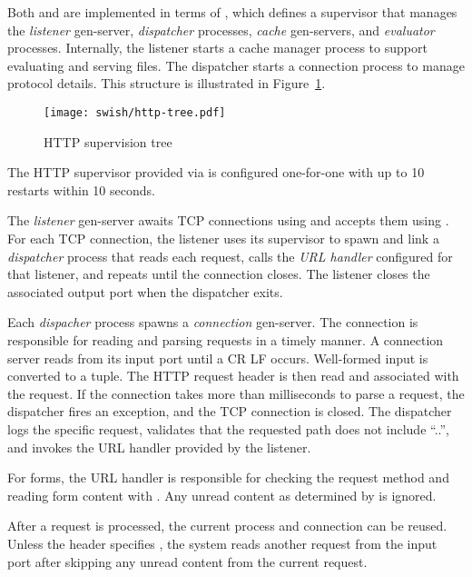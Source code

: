 Both  and  are
implemented in terms of , which defines a
supervisor that manages the \emph{listener} gen-server,
\emph{dispatcher} processes, \emph{cache} gen-servers, and
\emph{evaluator} processes. Internally, the listener starts a cache
manager process to support evaluating and serving files. The
dispatcher starts a connection process to manage protocol
details. This structure is illustrated in Figure~\ref{fig:http-tree}.

\begin{figure}
  \center\texttt{[image: swish/http-tree.pdf]}
  \caption{\label{fig:http-tree}HTTP supervision tree}
\end{figure}

The HTTP supervisor provided via  is
configured one-for-one with up to 10 restarts within 10 seconds.

The \emph{listener} gen-server awaits TCP connections using
 and accepts them using .  For each
TCP connection, the listener uses its supervisor to spawn and link a
\emph{dispatcher} process that reads each request, calls the \emph{URL
  handler} configured for that listener, and repeats until the
connection closes. The listener closes the associated output port when
the dispatcher exits.

Each \emph{dispacher} process spawns a \emph{connection}
gen-server. The connection is responsible for reading and parsing
requests in a timely manner.  A connection server reads from its input
port until a CR LF occurs.  Well-formed input is converted to a
 tuple. The HTTP request header is then read and
associated with the request.  If the connection takes more than
 milliseconds to parse a request, the dispatcher
fires an exception, and the TCP connection is closed.  The dispatcher
logs the specific request, validates that the requested path does not
include ``..'', and invokes the URL handler provided by the listener.

For forms, the URL handler is responsible for checking the request
method and reading form content with . Any
unread content as determined by  is ignored.

After a request is processed, the current process and connection can
be reused. Unless the  header specifies ,
the system reads another request from the input port after skipping
any unread content from the current request.


